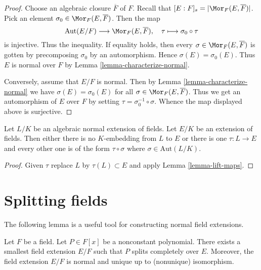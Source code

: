 \begin{proof}
Choose an algebraic closure $\overline{F}$ of $F$. Recall that
$[E : F]_s = |\Mor_F(E, \overline{F})|$. Pick an element
$\sigma_0 \in \Mor_F(E, \overline{F})$. Then the map
$$
\text{Aut}(E/F) \longrightarrow \Mor_F(E, \overline{F}),\quad
\tau \longmapsto \sigma_0 \circ \tau
$$
is injective. Thus the inequality. If equality holds, then
every $\sigma \in \Mor_F(E, \overline{F})$ is gotten by precomposing
$\sigma_0$ by an automorphism. Hence $\sigma(E) = \sigma_0(E)$.
Thus $E$ is normal over $F$ by Lemma \ref{lemma-characterize-normal}.

\medskip\noindent
Conversely, assume that $E/F$ is normal. Then by
Lemma \ref{lemma-characterize-normal} we have $\sigma(E) = \sigma_0(E)$
for all $\sigma \in \Mor_F(E, \overline{F})$.
Thus we get an automorphism of $E$ over $F$ by setting
$\tau = \sigma_0^{-1} \circ \sigma$. Whence the map displayed above
is surjective.
\end{proof}

\begin{lemma}
\label{lemma-normal-embeddings-differ-by-aut}
Let $L/K$ be an algebraic normal extension of fields.
Let $E/K$ be an extension of fields. Then either
there is no $K$-embedding from $L$ to $E$ or
there is one $\tau : L \to E$ and every other
one is of the form $\tau \circ \sigma$ where $\sigma \in \text{Aut}(L/K)$.
\end{lemma}

\begin{proof}
Given $\tau$ replace $L$ by $\tau(L) \subset E$ and apply
Lemma \ref{lemma-lift-maps}.
\end{proof}





\section{Splitting fields}
\label{section-splitting-fieds}

\noindent
The following lemma is a useful tool for constructing normal field extensions.

\begin{lemma}
\label{lemma-splitting-field}
Let $F$ be a field. Let $P \in F[x]$ be a nonconstant polynomial.
There exists a smallest field extension $E/F$ such that $P$
splits completely over $E$. Moreover, the field extension $E/F$ is normal
and unique up to (nonunique) isomorphism.
\end{lemma}

